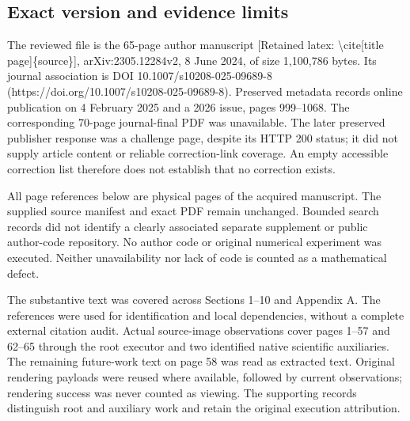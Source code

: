 \documentclass[10pt]{article}
\begin{document}
\subsection*{Exact version and evidence limits}
The reviewed file is the 65-page author manuscript [Retained latex: \textbackslash{}cite[title page]\{source\}], arXiv:2305.12284v2, 8 June 2024, of size 1,100,786 bytes. Its journal association is DOI 10.1007/s10208-025-09689-8 (https://doi.org/10.1007/s10208-025-09689-8). Preserved metadata records online publication on 4 February 2025 and a 2026 issue, pages 999–1068. The corresponding 70-page journal-final PDF was unavailable. The later preserved publisher response was a challenge page, despite its HTTP 200 status; it did not supply article content or reliable correction-link coverage. An empty accessible correction list therefore does not establish that no correction exists.\par
All page references below are physical pages of the acquired manuscript. The supplied source manifest and exact PDF remain unchanged. Bounded search records did not identify a clearly associated separate supplement or public author-code repository. No author code or original numerical experiment was executed. Neither unavailability nor lack of code is counted as a mathematical defect.\par
The substantive text was covered across Sections 1–10 and Appendix A. The references were used for identification and local dependencies, without a complete external citation audit. Actual source-image observations cover pages 1–57 and 62–65 through the root executor and two identified native scientific auxiliaries. The remaining future-work text on page 58 was read as extracted text. Original rendering payloads were reused where available, followed by current observations; rendering success was never counted as viewing. The supporting records distinguish root and auxiliary work and retain the original execution attribution.\par
\end{document}
